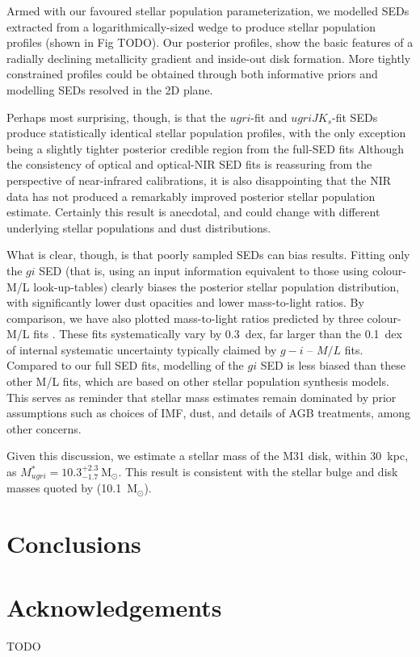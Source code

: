 \documentclass{iau}
\newcommand{\mnras}{MNRAS}       %
\begin{document}
Armed with our favoured stellar population parameterization, we modelled SEDs extracted from a logarithmically-sized wedge \citep[e.g.][their Fig TODO]{Courteau:2011} to produce stellar population profiles (shown in Fig TODO).
Our posterior profiles, show the basic features of a radially declining metallicity gradient and inside-out disk formation.
More tightly constrained profiles could be obtained through both informative priors and modelling SEDs resolved in the 2D plane.

Perhaps most surprising, though, is that the $ugri$-fit and $ugriJK_s$-fit SEDs produce statistically identical stellar population profiles, with the only exception being a slightly tighter posterior credible region from the full-SED fits
Although the consistency of optical and optical-NIR SED fits is reassuring from the perspective of near-infrared calibrations, it is also disappointing that the NIR data has not produced a remarkably improved posterior stellar population estimate.
Certainly this result is anecdotal, and could change with different underlying stellar populations and dust distributions.

What is clear, though, is that poorly sampled SEDs can bias results.
Fitting only the $gi$ SED (that is, using an input information equivalent to those using colour-M/L look-up-tables) clearly biases the posterior stellar population distribution, with significantly lower dust opacities and lower mass-to-light ratios. 
By comparison, we have also plotted mass-to-light ratios predicted by three colour-M/L fits \citep{Zibetti:2009,Taylor:2011,Into:2013}.
These fits systematically vary by 0.3~dex, far larger than the 0.1~dex of internal systematic uncertainty typically claimed by $g-i$ -- $M/L$ fits. 
Compared to our full SED fits, modelling of the $gi$ SED is less biased than these other M/L fits, which are based on other stellar population synthesis models.
This serves as reminder that stellar mass estimates remain dominated by prior assumptions such as choices of IMF, dust, and details of AGB treatments, among other concerns.

Given this discussion, we estimate a stellar mass of the M31 disk, within $30$~kpc, as $M_{ugri}^{*} = 10.3^{+2.3}_{-1.7}~\mathrm{M}_\odot$.
This result is consistent with the stellar bulge and disk masses quoted by \cite{Tamm:2012} (10.1~$\mathrm{M}_\odot$).

\section{Conclusions}


\section*{Acknowledgements}

\noindent TODO





\end{document}

